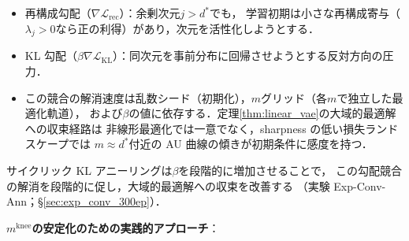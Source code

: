 \documentclass[11pt,a4paper]{jsarticle}
\newcommand{\mknee}{m^{\mathrm{knee}}}
\begin{document}
\begin{itemize}
  \item 再構成勾配（$\nabla\mathcal{L}_\mathrm{rec}$）：余剰次元$j > d^*$でも，
        学習初期は小さな再構成寄与（$\lambda_j > 0$なら正の利得）があり，次元を活性化しようとする．
  \item KL 勾配（$\beta\nabla\mathcal{L}_\mathrm{KL}$）：同次元を事前分布に回帰させようとする反対方向の圧力．
  \item この競合の解消速度は乱数シード（初期化），$m$グリッド（各$m$で独立した最適化軌道），
        および$\beta$の値に依存する．定理\ref{thm:linear_vae}の大域的最適解への収束経路は
        非線形最適化では一意でなく，sharpness の低い損失ランドスケープでは
        $m \approx d^*$付近の AU 曲線の傾きが初期条件に感度を持つ．
\end{itemize}

サイクリック KL アニーリング\cite{fu2019cyclical}は$\beta$を段階的に増加させることで，
この勾配競合の解消を段階的に促し，大域的最適解への収束を改善する
（実験 Exp-Conv-Ann；§\ref{sec:exp_conv_300ep}）．

\textbf{$\mknee$の安定化のための実践的アプローチ}：
\end{document}

